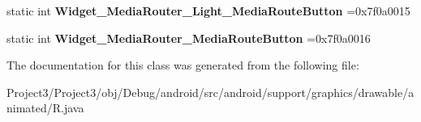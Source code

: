 \begin{DoxyCompactItemize}
static int {\bfseries Widget\+\_\+\+Media\+Router\+\_\+\+Light\+\_\+\+Media\+Route\+Button} =0x7f0a0015
\item 
\mbox{\label{classandroid_1_1support_1_1graphics_1_1drawable_1_1animated_1_1R_1_1style_aa67ab96f19b9ee3e9ca3dfb46350cd4f}} 
static int {\bfseries Widget\+\_\+\+Media\+Router\+\_\+\+Media\+Route\+Button} =0x7f0a0016
\end{DoxyCompactItemize}


The documentation for this class was generated from the following file\+:\begin{DoxyCompactItemize}
\item 
Project3/\+Project3/obj/\+Debug/android/src/android/support/graphics/drawable/animated/R.\+java\end{DoxyCompactItemize}
